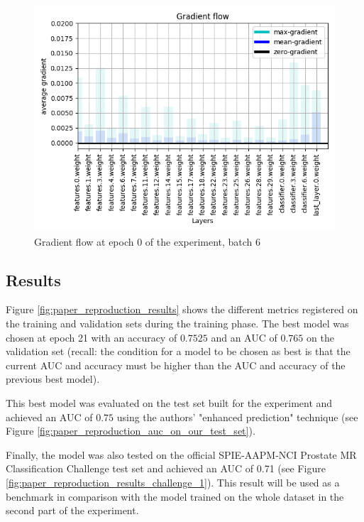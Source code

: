 \begin{figure}[!h]
\centering
\includegraphics[width=1\textwidth, keepaspectratio=true]{./figures/gradient_flow.png}
\caption{Gradient flow at epoch 0 of the experiment, batch 6}
\label{fig:gradient_flow}
\end{figure}


\subsection{Results}
\label{sec:paper_reproduction_results}
\setlength{\marginparwidth}{3cm}\leavevmode {}Figure \ref{fig:paper_reproduction_results} shows the different metrics registered on the training and validation sets during the training phase. The best model was chosen at epoch 21 with an accuracy of $0.7525$ and an AUC of $0.765$ on the validation set (recall: the condition for a model to be chosen as best is that the current AUC and accuracy must be higher than the AUC and accuracy of the previous best model).

\noindent This best model was evaluated on the test set built for the experiment and achieved an AUC of $0.75$ using the authors' "enhanced prediction" technique (see Figure \ref{fig:paper_reproduction_auc_on_our_test_set}).

Finally, the model was also tested on the official SPIE-AAPM-NCI Prostate MR Classification Challenge test set and achieved an AUC of 0.71 (see Figure \ref{fig:paper_reproduction_results_challenge_1}). This result will be used as a benchmark in comparison with the model trained on the whole dataset in the second part of the experiment.

